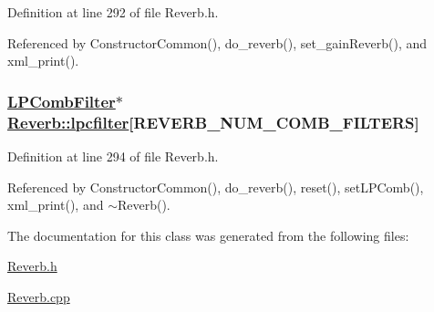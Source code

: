 Definition at line 292 of file Reverb.h.

Referenced by Constructor\-Common(), do\_\-reverb(), set\_\-gain\-Reverb(), and xml\_\-print().\hypertarget{classReverb_r3}{
\subsubsection[lpcfilter]{\setlength{\rightskip}{0pt plus 5cm}\hyperlink{classLPCombFilter}{LPComb\-Filter}$\ast$ \hyperlink{classReverb_r3}{Reverb::lpcfilter}\mbox{[}REVERB\_\-NUM\_\-COMB\_\-FILTERS\mbox{]}}}
\label{classReverb_r3}




Definition at line 294 of file Reverb.h.

Referenced by Constructor\-Common(), do\_\-reverb(), reset(), set\-LPComb(), xml\_\-print(), and $\sim$Reverb().

The documentation for this class was generated from the following files:\begin{CompactItemize}
\item 
\hyperlink{Reverb_8h}{Reverb.h}\item 
\hyperlink{Reverb_8cpp}{Reverb.cpp}\end{CompactItemize}
